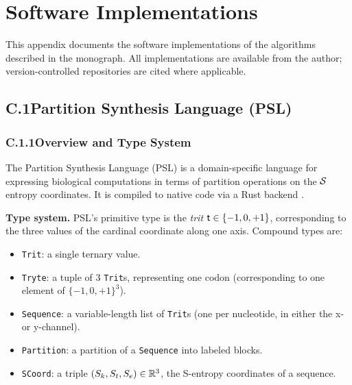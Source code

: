 
\chapter*{Software Implementations}
\label{app:software}

This appendix documents the software implementations of the algorithms
described in the monograph. All implementations are available from the
author; version-controlled repositories are cited where applicable.

\section*{C.1\quad Partition Synthesis Language (PSL)}
\label{app:psl}

\subsection*{C.1.1\quad Overview and Type System}

The Partition Synthesis Language (PSL) is a domain-specific language for
expressing biological computations in terms of partition operations on the
$\mathcal{S}$ entropy coordinates. It is compiled to native code via a Rust
backend \citep{Sachikonye2025_Computing}.

\medskip\noindent\textbf{Type system.} PSL's primitive type is the \emph{trit}
$\mathsf{t} \in \{-1, 0, +1\}$, corresponding to the three values of the cardinal
coordinate along one axis. Compound types are:
\begin{itemize}
  \item \texttt{Trit}: a single ternary value.
  \item \texttt{Tryte}: a tuple of 3 \texttt{Trit}s, representing one codon
        (corresponding to one element of $\{-1,0,+1\}^3$).
  \item \texttt{Sequence}: a variable-length list of \texttt{Trit}s (one per nucleotide,
        in either the x- or y-channel).
  \item \texttt{Partition}: a partition of a \texttt{Sequence} into labeled blocks.
  \item \texttt{SCoord}: a triple $(S_k, S_t, S_e) \in \mathbb{R}^3$, the
        S-entropy coordinates of a sequence.
\end{itemize}

